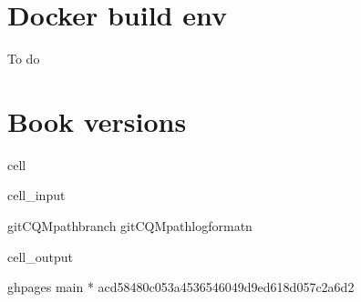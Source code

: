\documentclass[letterpaper,table,10pt,english]{jupyterBook}
\begin{document}
\section{Docker build env}
\label{\detokenize{tests/build_versions_checks:docker-build-env}}
\sphinxAtStartPar
To do


\section{Book versions}
\label{\detokenize{tests/build_versions_checks:book-versions}}
\begin{sphinxuseclass}{cell}\begin{sphinxVerbatimInput}

\begin{sphinxuseclass}{cell_input}
\begin{sphinxVerbatim}[commandchars=\\\{\}]
  
git\PYGZhy{}CQMpathbranch
git\PYGZhy{}CQMpathlog\PYGZhy{}\PYGZhy{}format\PYGZhy{}n
\end{sphinxVerbatim}

\end{sphinxuseclass}\end{sphinxVerbatimInput}
\begin{sphinxVerbatimOutput}

\begin{sphinxuseclass}{cell_output}
\begin{sphinxVerbatim}[commandchars=\\\{\}]
  gh\PYGZhy{}pages
  main
* 
acd58480c053a4536546049d9ed618d057c2a6d2
\end{sphinxVerbatim}

\end{sphinxuseclass}\end{sphinxVerbatimOutput}

\end{sphinxuseclass}
\end{document}
